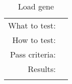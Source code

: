 \begin{table}[H]
  \begin{tabular}{r | p{8cm}}
    \noalign{\smallskip}\hline\noalign{\smallskip}
    
    What to test:  &  \\

    \noalign{\smallskip}\hline\noalign{\smallskip}

    How to test:   &  \\

    \noalign{\smallskip}\hline\noalign{\smallskip}

    Pass criteria: &  \\

    \noalign{\smallskip}\hline\noalign{\smallskip}
    
    Results: &   \\
   \noalign{\smallskip}\hline\noalign{\smallskip}
  
  
  
  \end{tabular}
  \caption{Load gene}
  \label{testing:fitness:pipeline_test}
\end{table}